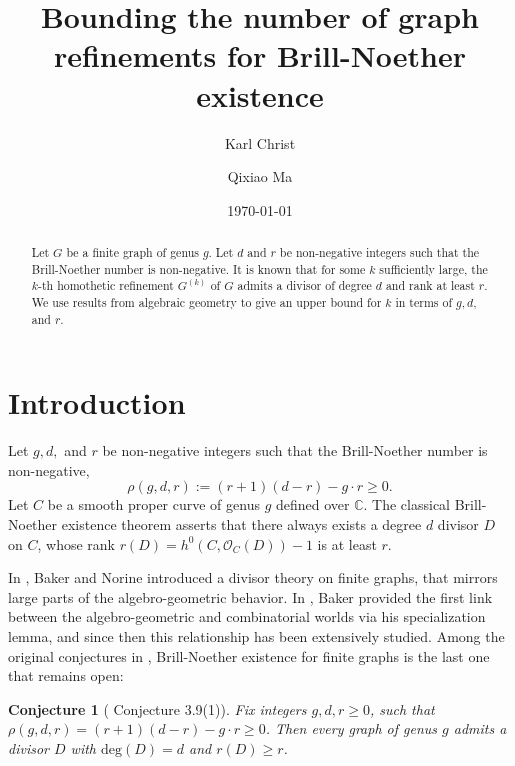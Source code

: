 \documentclass[11pt]{amsart}
\title{Bounding the number of graph refinements for Brill-Noether existence}
\date{\today}
\author{Karl Christ}
\author{Qixiao Ma}
\newtheorem*{conjecture}{Conjecture}
\begin{document}
\maketitle



\begin{abstract}
Let $G$ be a finite graph of genus $g$. Let $d$ and $r$ be non-negative integers such that the Brill-Noether number is non-negative.
It is known that for some $k$ sufficiently large, the $k$-th homothetic refinement $G^{(k)}$ of $G$ admits a divisor of degree $d$ and rank at least $r$. We use results from algebraic geometry to give an upper bound for $k$ in terms of $g,d,$ and $r$.
\end{abstract}
\section{Introduction}
Let $g,d,$ and $r$ be non-negative integers such that the Brill-Noether number is non-negative,  $$\rho(g,d,r):=(r+1)(d-r)-g\cdot r\geq0.$$ 
Let $C$ be a smooth proper curve of genus $g$ defined over $\mathbb{C}$. The classical Brill-Noether existence theorem %
asserts that there always exists a degree $d$ divisor $D$ on $C$, whose rank $r(D)=h^0(C,\mathcal{O}_C(D))-1$ is at least $r$. %

In \cite{BN}, Baker and Norine introduced a divisor theory on finite graphs, that mirrors large parts of the algebro-geometric behavior. In \cite{MR2448666}, Baker provided the first link between the algebro-geometric and combinatorial worlds via his specialization lemma, and since then this relationship has been extensively studied. Among the original conjectures in \cite{MR2448666}, Brill-Noether existence for finite graphs is the last one that remains open: 
\begin{conjecture}[\cite{MR2448666} Conjecture 3.9(1)]{\label{c1}}
Fix integers $g,d,r\geq0$, such that $\rho(g,d,r)=(r+1)(d-r)-g\cdot r \geq 0$. Then every graph of genus $g$ admits a divisor $D$ with $\mathrm{deg}(D)=d$ and $r(D)\geq r$.
\end{conjecture}
\end{document}

